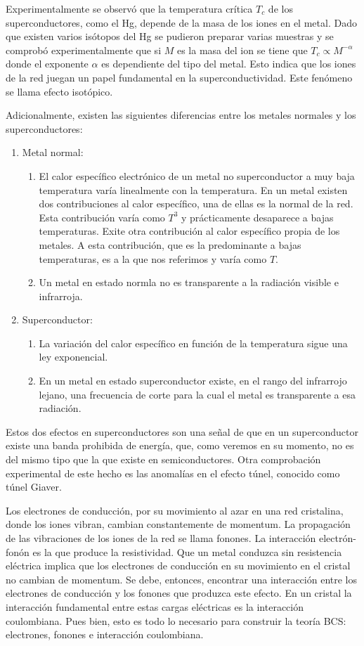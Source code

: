 Experimentalmente se observó que la temperatura crítica $T_c$ de los superconductores, como el Hg, depende de la masa de los iones en el metal. Dado que existen varios isótopos del Hg se pudieron preparar varias muestras y se comprobó experimentalmente que si $M$ es la masa del ion se tiene que $T_c \propto M^{-\alpha}$ donde el exponente $\alpha$ es dependiente del tipo del metal. Esto indica que los iones de la red juegan un papel fundamental en la superconductividad. Este fenómeno se llama efecto isotópico.

Adicionalmente, existen las siguientes diferencias entre los metales normales y los superconductores:

\begin{enumerate}
\item Metal normal:
\begin{enumerate}
    \item El calor específico electrónico de un metal no superconductor a muy baja temperatura varía linealmente con la temperatura. En un metal existen dos contribuciones al calor específico, una de ellas es la normal de la red. Esta contribución varía como $T^3$ y prácticamente desaparece a bajas temperaturas. Exite otra contribución al calor específico propia de los metales. A esta contribución, que es la predominante a bajas temperaturas, es a la que nos referimos y varía como $T$.
    \item Un metal en estado normla no es transparente a la radiación visible e infrarroja.
\end{enumerate}
\item Superconductor:
\begin{enumerate}
    \item La variación del calor específico en función de la temperatura sigue una ley exponencial.
    \item En un metal en estado superconductor existe, en el rango del infrarrojo lejano, una frecuencia de corte para la cual el metal es transparente a esa radiación.
\end{enumerate}
\end{enumerate}

Estos dos efectos en superconductores son una señal de que en un superconductor existe una banda prohibida de energía, que, como veremos en su momento, no es del mismo tipo que la que existe en semiconductores. Otra comprobación experimental de este hecho es las anomalías en el efecto túnel, conocido como túnel Giaver.

Los electrones de conducción, por su movimiento al azar en una red cristalina, donde los iones vibran, cambian constantemente de momentum. La propagación de las vibraciones de los iones de la red se llama fonones. La interacción electrón-fonón es la que produce la resistividad. Que un metal conduzca sin resistencia eléctrica implica que los electrones de conducción en su movimiento en el cristal no cambian de momentum. Se debe, entonces, encontrar una interacción entre los electrones de conducción y los fonones que produzca este efecto. En un cristal la interacción fundamental entre estas cargas eléctricas es la interacción coulombiana. Pues bien, esto es todo lo necesario para construir la teoría BCS: electrones, fonones e interacción coulombiana.

